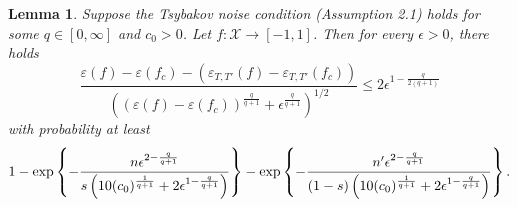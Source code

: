 \documentclass{article}
\newtheorem{lemma}{Lemma}
\begin{document}
\begin{lemma}\label{Bernsteintau}
Suppose the Tsybakov noise condition (Assumption 2.1) holds for some $q\in [0, \infty]$ and $c_0 >0$. Let $f: {\mathcal X} \to [-1, 1]$. Then for every
$\epsilon>0$, there holds
$$\frac{\varepsilon (f) - \varepsilon (f_c) - \left(\varepsilon_{T, T'} (f) - \varepsilon_{T, T'} (f_c)\right)}{\left(\left(\varepsilon (f) - \varepsilon (f_c)\right)^{\frac{q}{q+1}} + \epsilon^{\frac{q}{q+1}}\right)^{1/2}} \leq 2 \epsilon^{1-{\frac{q}{2(q+1)}}} 
$$
with probability at least 
\begin{eqnarray*}
1-  \exp \left\{-
{n \epsilon^{2-{\frac{q}{q+1}}} \over s\left(10 (c_0)^{\frac{1}{q+1}} +2 \epsilon^{1-{\frac{q}{q+1}}}\right)}\right\} - \exp \left\{-
{n' \epsilon^{2-{\frac{q}{q+1}}} \over (1-s) \left(10 (c_0)^{\frac{1}{q+1}} +2 \epsilon^{1-{\frac{q}{q+1}}}\right)}\right\}. 
\end{eqnarray*}
\end{lemma}
\end{document}
